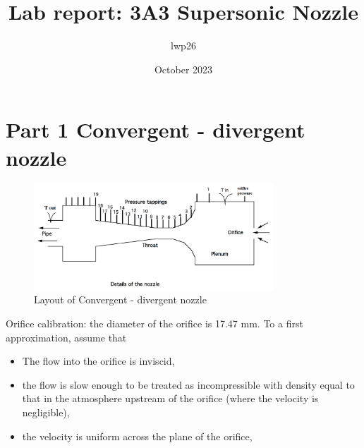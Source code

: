 \documentclass[8pt]{article}
\begin{document}

\title{Lab report: 3A3 Supersonic Nozzle}
\author{lwp26}
\date{October 2023}
\maketitle

\section{Part 1 Convergent - divergent nozzle}

\begin{figure}[H]
    \centering
    \includegraphics[width=0.8\textwidth]{small_nozzle_layout.png}
    \caption{Layout of Convergent - divergent nozzle}
    \label{fig:figure1}
\end{figure}

Orifice calibration: the diameter of the orifice is 17.47 mm. To a first approximation, assume that
\begin{itemize}
    \item The flow into the orifice is inviscid,
    \item the flow is slow enough to be treated as incompressible with density equal to that in the atmosphere upstream of the orifice (where the velocity is negligible),
    \item the velocity is uniform across the plane of the orifice,
\end{itemize} 
\end{document}
